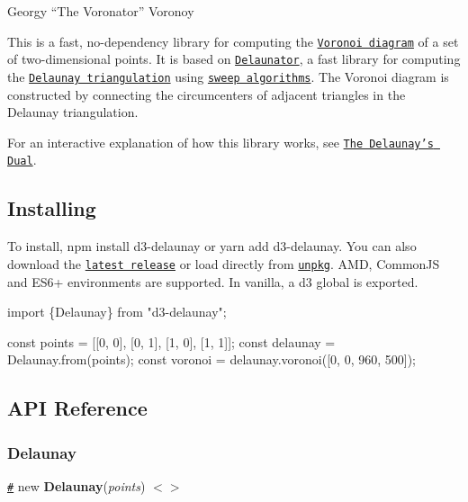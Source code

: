  

Georgy “\+The Voronator” Voronoy

This is a fast, no-\/dependency library for computing the \href{https://en.wikipedia.org/wiki/Voronoi_diagram}{\tt Voronoi diagram} of a set of two-\/dimensional points. It is based on \href{https://github.com/mapbox/delaunator}{\tt Delaunator}, a fast library for computing the \href{https://en.wikipedia.org/wiki/Delaunay_triangulation}{\tt Delaunay triangulation} using \href{https://github.com/mapbox/delaunator/blob/master/README.md#papers}{\tt sweep algorithms}. The Voronoi diagram is constructed by connecting the circumcenters of adjacent triangles in the Delaunay triangulation.

For an interactive explanation of how this library works, see \href{https://observablehq.com/@mbostock/the-delaunays-dual}{\tt The Delaunay’s Dual}.

\subsection*{Installing}

To install, {\ttfamily npm install d3-\/delaunay} or {\ttfamily yarn add d3-\/delaunay}. You can also download the \href{https://github.com/d3/d3-delaunay/releases/latest}{\tt latest release} or load directly from \href{https://unpkg.com/d3-delaunay/}{\tt unpkg}. A\+MD, Common\+JS and E\+S6+ environments are supported. In vanilla, a {\ttfamily d3} global is exported.


\begin{DoxyCode}
import \{Delaunay\} from "d3-delaunay";

const points = [[0, 0], [0, 1], [1, 0], [1, 1]];
const delaunay = Delaunay.from(points);
const voronoi = delaunay.voronoi([0, 0, 960, 500]);
\end{DoxyCode}


\subsection*{A\+PI Reference}

\subsubsection*{Delaunay}

\href{#new_Delaunay}{\tt \#} new {\bfseries Delaunay}({\itshape points}) \href{https://github.com/d3/d3-delaunay/blob/master/src/delaunay.js}{\tt $<$$>$}


